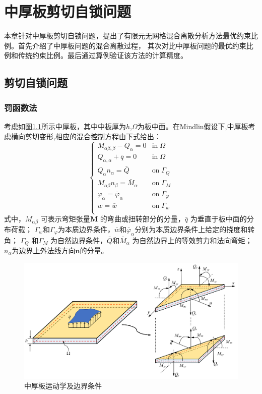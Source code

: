 \chapter{中厚板剪切自锁问题}
本章针对中厚板剪切自锁问题，提出了有限元无网格混合离散分析方法最优约束比例。首先介绍了中厚板问题的混合离散过程，
其次对比中厚板问题的最优约束比例和传统约束比例。最后通过算例验证该方法的计算精度。

\section{剪切自锁问题}      
\subsection{罚函数法}
考虑如图\ref{mindlin_picture}所示中厚板，其中中板厚为$h$,$\Omega$为板中面。在Mindlin假设下,中厚板考虑横向剪切变形,相应的混合控制方程由下式给出：
\begin{equation}\label{strong_mindlin}
    \begin{cases}
        M_{\alpha\beta,\beta} - Q_\alpha = 0 & \textrm{in}\; \Omega \\
        Q_{\alpha,\alpha} + \bar q = 0 & \textrm{in}\; \Omega \\    Q_\alpha n_\alpha = \bar Q & \textrm{on}\; \Gamma_Q \\
        M_{\alpha\beta} n_\beta = \bar M_\alpha & \textrm{on}\; \Gamma_M \\
        \varphi_\alpha = \bar \varphi_\alpha & \textrm{on}\; \Gamma_\varphi \\
        w = \bar w & \textrm{on}\; \Gamma_w \\
    \end{cases}
\end{equation}
式中，$M_{\alpha \beta}$ 可表示弯矩张量$\pmb{M}$ 的弯曲或扭转部分的分量，$\bar{q}$ 为垂直于板中面的分布荷载；
$\Gamma_w$和$\Gamma_\varphi$为本质边界条件，$\bar{w}$和$\bar{\varphi}_\alpha$分别为本质边界条件上给定的挠度和转角；
$\Gamma_Q$ 和$\Gamma_M$ 为自然边界条件，$\bar Q$和$\bar{M}_{\alpha}$ 为自然边界上的等效剪力和法向弯矩；
$n_\alpha$为边界上外法线方向$\pmb{n}$的分量。
\begin{figure}[H]
    \centering 
        \includegraphics[scale=0.5]{figures/shearlocking/Mindlinplate.png}
        \caption{中厚板运动学及边界条件}\label{mindlin_picture}
\end{figure}

